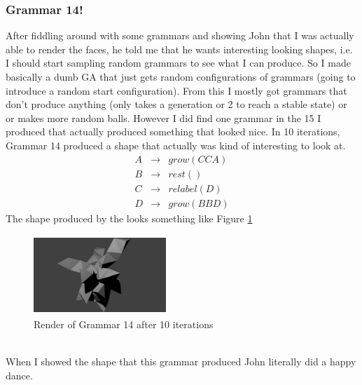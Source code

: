 \documentclass[letterpaper,oneside,titlepage]{article}
\begin{document}
\subsubsection{Grammar 14!}
After fiddling around with some grammars and showing John that I was actually able to render the faces, he told me that he wants interesting looking shapes, i.e. I should start sampling random grammars to see what I can produce.  So I made basically a dumb GA that just gets random configurations of grammars (going to introduce a random start configuration).  From this I mostly got grammars that don't produce anything (only takes a generation or 2 to reach a stable state) or or makes more random balls.  However I did find one grammar in the 15 I produced that actually produced something that looked nice.  In 10 iterations, Grammar 14 produced a shape that actually was kind of interesting to look at.
\begin{displaymath}
  \begin{matrix}
    A & \to & grow(CCA) \\
    B & \to & rest() \\
    C & \to & relabel(D) \\
    D & \to & grow(BBD)
  \end{matrix}
\end{displaymath}
The shape produced by the looks something like Figure \ref{fig:gram14render} \\
\begin{figure}[h]
  \centering
  \includegraphics[width=5cm, height=3cm]{gram14}
  \caption{Render of Grammar 14 after 10 iterations}
  \label{fig:gram14render}
\end{figure} \\
When I showed the shape that this grammar produced John literally did a happy dance.
\end{document}

